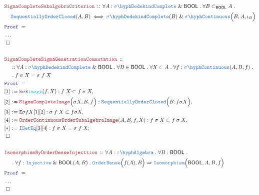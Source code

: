 \documentclass[12pt]{scrartcl}
\newcommand{\TYPE}[1]{\textcolor{NavyBlue}{\mathtt{#1}}}
\newcommand{\FUNC}[1]{\textcolor{Cerulean}{\mathtt{#1}}}
\newcommand{\LOGIC}[1]{\textcolor{Blue}{\mathtt{#1}}}
\newcommand{\THM}[1]{\textcolor{Maroon}{\mathtt{#1}}}
\renewcommand{\.}{\; . \;}
\newcommand{\de}{: \kern 0.1pc =}
\newcommand{\Theorem}[2]{& \THM{#1} \, :: \, #2 \\ & \Proof = \\ }
\newcommand{\NewLine}{\\ & \kern 1pc}
\newcommand{\Page}[1]{ \begin{align*} #1 \end{align*}   }
\newcommand{\NoProof}{ & \ldots \\ \EndProof}
\renewcommand{\And}{\; \& \;}
\newcommand{\Imply}{\Rightarrow}
\newcommand{\Intro}{\LOGIC{I}}
\newcommand{\Elim}{\LOGIC{E}}
\newcommand{\Say}[3]{& #1 \de #2 : #3, \\}
\newcommand{\Conclude}[3]{& #1 \de #2 : #3; \\}
\newcommand{\QED}{\; \square}
\newcommand{\EndProof}{& \QED \\}
\newcommand{\Proof}{\LOGIC{Proof} \; }
\newcommand{\SOC}{\TYPE{SequentiallyOrderClosed}}
\newcommand{\sC}{\TYPE{\sigma\hyph Continuous}}
\newcommand{\OD}{\TYPE{OrderDense}}
\newcommand{\TAlgebra}{\TYPE{\tau\hyph Algebra}}
\newcommand{\SComplete}{\TYPE{\sigma\hyph DedekindComplete}}
\newcommand{\BOOL}{\mathsf{BOOL}}
\begin{document}
\Page{
	\Theorem{SigmaCompleteSubalgebraCriterion}
	{
		\forall A : \SComplete \And \BOOL \.
		\forall B \subset_\BOOL A \.
		\NewLine
		\SOC(A,B) 
		\iff 
		\SComplete(B)
		\And 
		\sC\Big(B,A, \iota_B \Big)
	}
	\NoProof
	\\
	\Theorem{SigmaCompleteSigmaGenetrationCommutation}
	{
		\NewLine ::
		\forall A : \SComplete \And \BOOL \.
		\forall B \in \BOOL \. 
		\forall X \subset A \.
		\forall f : \sC(A,B,f) \.
		\NewLine \. 
		f\; \sigma \; X = \sigma \; f \; X
	}
	\Say{[1]}{\Elim \sigma \Elim \FUNC{image}(f,X)}
	{
		f\; X \subset f \; \sigma \; X
	}
	\Say{[2]}{\THM{SigmaCompleteImage}\Big( \sigma X, B, f\Big)}
	{
		\SOC\Big(B, f \sigma X\Big)
	}
	\Say{[3]}{\Elim \sigma f X [1][2]}
	{
		\sigma \; f \;X \subset f \sigma X
	}
	\Say{[4]}{\THM{OrderContinuousOrderSubalgebraImage}(A,B,f,X)}
	{
		f \; \sigma \; X \subset f \; \sigma \; X
	}
	\Conclude{[*]}{\Intro \TYPE{SetEq}[3][4]}
	{
		f \; \sigma \; X = \sigma \; f \; X
	}
	\EndProof
	\\
	\Theorem{IsomorphismByOrderDenseInjecttion}
	{
		\forall A  : \TAlgebra \.
		\forall B : \BOOL \.
		\NewLine \. 
		\forall f : \TYPE{Injective} \And \BOOL(A,B) \.
		\OD\Big(f(A),B\Big)
		\Imply
		\TYPE{Isomorphism}\Big(\BOOL,A,B,f \Big)
	}
	\NoProof
}
\newpage
\end{document}
